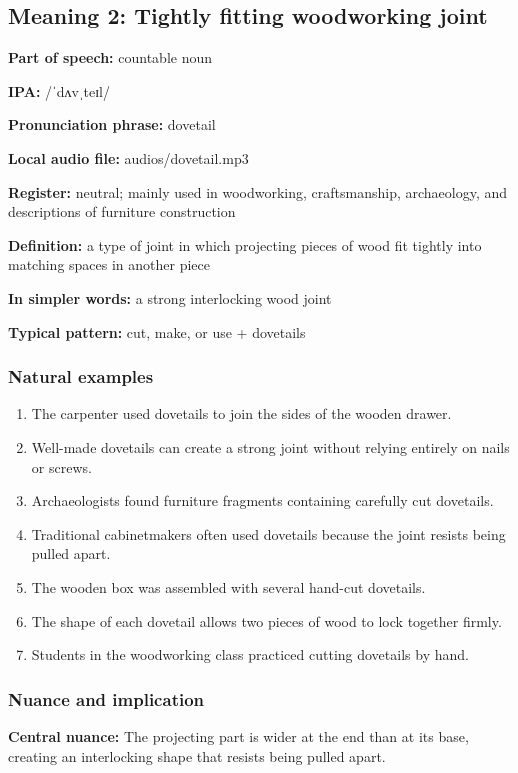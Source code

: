 \documentclass[11pt]{article}
\begin{document}
\subsection{Meaning 2: Tightly fitting woodworking joint}
\textbf{Part of speech:} countable noun

\textbf{IPA:} /ˈdʌvˌteɪl/

\textbf{Pronunciation phrase:} dovetail

\textbf{Local audio file:} audios/dovetail.mp3

\textbf{Register:} neutral; mainly used in woodworking, craftsmanship, archaeology, and descriptions of furniture construction

\textbf{Definition:} a type of joint in which projecting pieces of wood fit tightly into matching spaces in another piece

\textbf{In simpler words:} a strong interlocking wood joint

\textbf{Typical pattern:} cut, make, or use + dovetails

\subsubsection{Natural examples}
\begin{enumerate}
  \item The carpenter used dovetails to join the sides of the wooden drawer.
  \item Well-made dovetails can create a strong joint without relying entirely on nails or screws.
  \item Archaeologists found furniture fragments containing carefully cut dovetails.
  \item Traditional cabinetmakers often used dovetails because the joint resists being pulled apart.
  \item The wooden box was assembled with several hand-cut dovetails.
  \item The shape of each dovetail allows two pieces of wood to lock together firmly.
  \item Students in the woodworking class practiced cutting dovetails by hand.
\end{enumerate}

\subsubsection{Nuance and implication}
\textbf{Central nuance:} The projecting part is wider at the end than at its base, creating an interlocking shape that resists being pulled apart.
\end{document}
